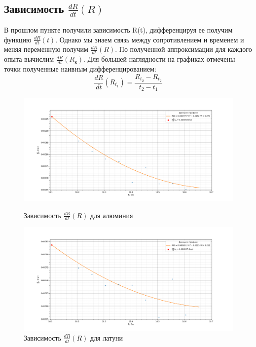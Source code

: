\documentclass[a4paper, 12pt]{article}%
\begin{document}
	\subsection{Зависимость $\frac{dR}{dt}(R)$}
	В прошлом пункте получили зависимость R(t), дифференцируя ее получим функцию $\frac{dR}{dt}(t)$. Однако мы знаем связь между сопротивлением и временем и меняя переменную получим $\frac{dR}{dt}(R)$. По полученной аппроксимации для каждого опыта вычислим $\frac{dR}{dt}(R_{к})$. Для большей наглядности на графиках отмечены точки полученные наивным дифференцированием:
	\begin{equation}
		\frac{dR}{dt} \left( R_{t_{1}} \right) = \frac{R_{t_{2}} - R_{t_{2}}}{t_{2} - t_{1}}
		\label{eq:derivates}
	\end{equation}
		\begin{figure}[H]
		\begin{center}
			\begin{minipage}[h]{0.48\linewidth}
				\includegraphics[width=1\linewidth]{deriv_al}
				\caption{Зависимость $\frac{dR}{dt}(R)$ для алюминия} %
			\end{minipage}
			\hfill
			\begin{minipage}[h]{0.48\linewidth}
				\includegraphics[width=1\linewidth]{deriv_lat}
				\caption{Зависимость $\frac{dR}{dt}(R)$ для латуни}
				

\end{minipage}
\end{center}
\end{figure}
\end{document}
